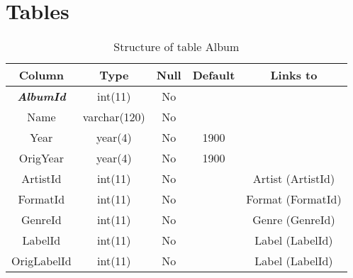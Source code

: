 \chapter*{Tables}
{}
\renewcommand\thetable{1.\arabic{table}}
\setcounter{table}{0}

%
%
\begin{longtable}{|c|c|c|c|c|} 
\caption{Structure of table Album} 
\label{tab:Album-structure} \\
\hline 
\multicolumn{1}{|c|}{\textbf{Column}} & \multicolumn{1}{|c|}{\textbf{Type}} & \multicolumn{1}{|c|}{\textbf{Null}} & \multicolumn{1}{|c|}{\textbf{Default}} & \multicolumn{1}{|c|}{\textbf{Links to}} \\
\hline
\textbf{\textit{AlbumId}} & int(11) & No &  &  \\ 
\hline 
Name & varchar(120) & No &  &  \\ 
\hline 
Year & year(4) & No & 1900  &  \\ 
\hline 
OrigYear & year(4) & No & 1900 &  \\ 
\hline 
ArtistId & int(11) & No &  & Artist (ArtistId) \\ 
\hline 
FormatId & int(11) & No &  & Format (FormatId) \\ 
\hline 
GenreId & int(11) & No &  & Genre (GenreId) \\ 
\hline 
LabelId & int(11) & No &  & Label (LabelId) \\ 
\hline 
OrigLabelId & int(11) & No &  & Label (LabelId) \\ 
\hline 
\end{longtable}

%
%


